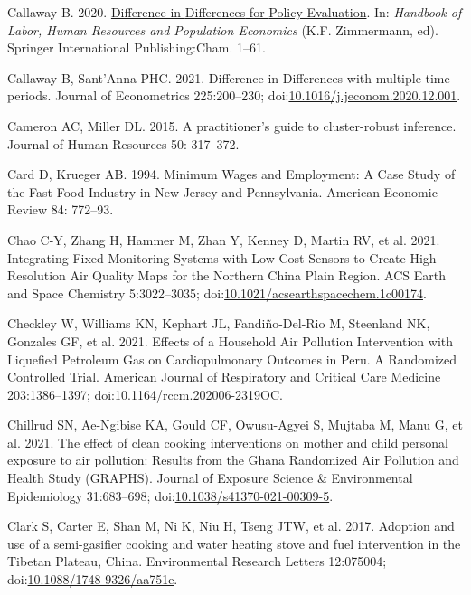 \documentclass[
  letterpaper,
  DIV=11,
  numbers=noendperiod]{scrartcl}
\newlength{\cslhangindent}
\newenvironment{CSLReferences}[2] %
 {\begin{list}{}{%
  \setlength{\itemindent}{0pt}
  \setlength{\leftmargin}{0pt}
  \setlength{\parsep}{0pt}
  \ifodd #1
   \setlength{\leftmargin}{\cslhangindent}
   \setlength{\itemindent}{-1\cslhangindent}
  \fi
  \setlength{\itemsep}{#2\baselineskip}}}
 {\end{list}}
\begin{document}
\begin{CSLReferences}{1}{1}
Callaway B. 2020.
\href{https://doi.org/10.1007/978-3-319-57365-6_352-1}{Difference-in-{Differences}
for {Policy Evaluation}}. In: \emph{Handbook of {Labor}, {Human
Resources} and {Population Economics}} (K.F. Zimmermann, ed). Springer
International Publishing:Cham. 1--61.

Callaway B, Sant'Anna PHC. 2021. Difference-in-{Differences} with
multiple time periods. Journal of Econometrics 225:200--230;
doi:\href{https://doi.org/10.1016/j.jeconom.2020.12.001}{10.1016/j.jeconom.2020.12.001}.

Cameron AC, Miller DL. 2015. A practitioner's guide to cluster-robust
inference. Journal of Human Resources 50: 317--372.

Card D, Krueger AB. 1994. Minimum {Wages} and {Employment}: {A Case
Study} of the {Fast-Food Industry} in {New Jersey} and {Pennsylvania}.
American Economic Review 84: 772--93.

Chao C-Y, Zhang H, Hammer M, Zhan Y, Kenney D, Martin RV, et al. 2021.
Integrating {Fixed Monitoring Systems} with {Low-Cost Sensors} to
{Create High-Resolution Air Quality Maps} for the {Northern China Plain
Region}. ACS Earth and Space Chemistry 5:3022--3035;
doi:\href{https://doi.org/10.1021/acsearthspacechem.1c00174}{10.1021/acsearthspacechem.1c00174}.

Checkley W, Williams KN, Kephart JL, Fandiño-Del-Rio M, Steenland NK,
Gonzales GF, et al. 2021. Effects of a {Household Air Pollution
Intervention} with {Liquefied Petroleum Gas} on {Cardiopulmonary
Outcomes} in {Peru}. {A Randomized Controlled Trial}. American Journal
of Respiratory and Critical Care Medicine 203:1386--1397;
doi:\href{https://doi.org/10.1164/rccm.202006-2319OC}{10.1164/rccm.202006-2319OC}.

Chillrud SN, Ae-Ngibise KA, Gould CF, Owusu-Agyei S, Mujtaba M, Manu G,
et al. 2021. The effect of clean cooking interventions on mother and
child personal exposure to air pollution: Results from the {Ghana
Randomized Air Pollution} and {Health Study} ({GRAPHS}). Journal of
Exposure Science \& Environmental Epidemiology 31:683--698;
doi:\href{https://doi.org/10.1038/s41370-021-00309-5}{10.1038/s41370-021-00309-5}.

Clark S, Carter E, Shan M, Ni K, Niu H, Tseng JTW, et al. 2017. Adoption
and use of a semi-gasifier cooking and water heating stove and fuel
intervention in the {Tibetan Plateau}, {China}. Environmental Research
Letters 12:075004;
doi:\href{https://doi.org/10.1088/1748-9326/aa751e}{10.1088/1748-9326/aa751e}.


\end{CSLReferences}
\end{document}
